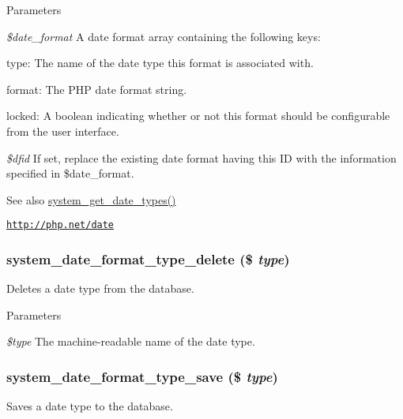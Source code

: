 \begin{DoxyParams}{Parameters}
\item[{\em \$date\_\-format}]A date format array containing the following keys:
\begin{DoxyItemize}
\item type: The name of the date type this format is associated with.
\item format: The PHP date format string.
\item locked: A boolean indicating whether or not this format should be configurable from the user interface. 
\end{DoxyItemize}\item[{\em \$dfid}]If set, replace the existing date format having this ID with the information specified in \$date\_\-format.\end{DoxyParams}
\begin{DoxySeeAlso}{See also}
\hyperlink{system_8module_a591ee79a1b5ebbcbc8b2162a74e965b2}{system\_\-get\_\-date\_\-types()} 

\href{http://php.net/date}{\tt http://php.net/date} 
\end{DoxySeeAlso}
\hypertarget{system_8module_ac495d113f7fcd34fe1cee36c6a2d51b9}{
\subsubsection[{system\_\-date\_\-format\_\-type\_\-delete}]{\setlength{\rightskip}{0pt plus 5cm}system\_\-date\_\-format\_\-type\_\-delete (\$ {\em type})}}
\label{system_8module_ac495d113f7fcd34fe1cee36c6a2d51b9}
Deletes a date type from the database.


\begin{DoxyParams}{Parameters}
\item[{\em \$type}]The machine-\/readable name of the date type. \end{DoxyParams}
\hypertarget{system_8module_a88de386e3357b4531e37f56c26c20a9c}{
\subsubsection[{system\_\-date\_\-format\_\-type\_\-save}]{\setlength{\rightskip}{0pt plus 5cm}system\_\-date\_\-format\_\-type\_\-save (\$ {\em type})}}
\label{system_8module_a88de386e3357b4531e37f56c26c20a9c}
Saves a date type to the database.



